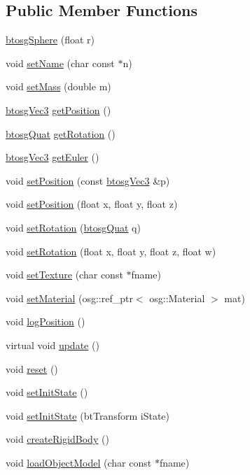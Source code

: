 \subsection*{Public Member Functions}
\begin{DoxyCompactItemize}
\item 
\hyperlink{classbtosgSphere_a39cc5391405e85edcef16200b52e905c}{btosg\+Sphere} (float r)
\item 
void \hyperlink{classbtosgObject_ab06a1b3f357209214c6440cd5746523e}{set\+Name} (char const $\ast$n)
\item 
void \hyperlink{classbtosgObject_a91da93c82d48b86192f0cbb16054fe57}{set\+Mass} (double m)
\item 
\hyperlink{classbtosgVec3}{btosg\+Vec3} \hyperlink{classbtosgObject_a3dadd5da8f2a312e44a039446b93d4cd}{get\+Position} ()
\item 
\hyperlink{classbtosgQuat}{btosg\+Quat} \hyperlink{classbtosgObject_a3b825999ad3a51bde743d4085ff19dae}{get\+Rotation} ()
\item 
\hyperlink{classbtosgVec3}{btosg\+Vec3} \hyperlink{classbtosgObject_a2019ec63bde02b72600450c7c985e77a}{get\+Euler} ()
\item 
void \hyperlink{classbtosgObject_ace6b51040b7ddce90818174200cc6074}{set\+Position} (const \hyperlink{classbtosgVec3}{btosg\+Vec3} \&p)
\item 
void \hyperlink{classbtosgObject_adb9f2cff0faf66dc252cd7c97b11ac84}{set\+Position} (float x, float y, float z)
\item 
void \hyperlink{classbtosgObject_a6365748d5506bb9da31907c9988071fa}{set\+Rotation} (\hyperlink{classbtosgQuat}{btosg\+Quat} q)
\item 
void \hyperlink{classbtosgObject_a4d21ca59b944fd26644db35d3e9ba67a}{set\+Rotation} (float x, float y, float z, float w)
\item 
void \hyperlink{classbtosgObject_aff54acbc7c66811efb0cf2838107a241}{set\+Texture} (char const $\ast$fname)
\item 
void \hyperlink{classbtosgObject_a6ab7b9e0553dab398b980637788b56a8}{set\+Material} (osg\+::ref\+\_\+ptr$<$ osg\+::\+Material $>$ mat)
\item 
void \hyperlink{classbtosgObject_acfd70fa6477c80fd7f29ad7ab9f4f067}{log\+Position} ()
\item 
virtual void \hyperlink{classbtosgObject_a342917817dfde62554f83da8e0d5110b}{update} ()
\item 
void \hyperlink{classbtosgObject_a93983f9180dd0672f8779cf2baa78580}{reset} ()
\item 
void \hyperlink{classbtosgObject_ad1508a0ce28cfac83e5f0ff6245f91b5}{set\+Init\+State} ()
\item 
void \hyperlink{classbtosgObject_a6ceb08e59ee95acaaef389ee198d2b56}{set\+Init\+State} (bt\+Transform i\+State)
\item 
void \hyperlink{classbtosgObject_a029dbe9134fa94e7355799f67fb2cd6d}{create\+Rigid\+Body} ()
\item 
void \hyperlink{classbtosgObject_a91838b8235579da178fcc06e6d3d47f3}{load\+Object\+Model} (char const $\ast$fname)
\end{DoxyCompactItemize}
